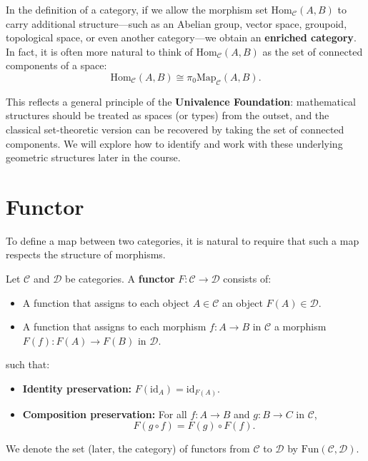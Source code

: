 \begin{remark}
In the definition of a category, if we allow the morphism set $\mathrm{Hom}_{\mathcal{C}}(A, B)$ to carry additional structure—such as an Abelian group, vector space, groupoid, topological space, or even another category—we obtain an \textbf{enriched category}. In fact, it is often more natural to think of $\mathrm{Hom}_{\mathcal{C}}(A, B)$ as the set of connected components of a space:
\[
\mathrm{Hom}_{\mathcal{C}}(A, B) \cong \pi_0 \mathrm{Map}_{\mathcal{C}}(A, B).
\]

This reflects a general principle of the \textbf{Univalence Foundation}: mathematical structures should be treated as spaces (or types) from the outset, and the classical set-theoretic version can be recovered by taking the set of connected components. We will explore how to identify and work with these underlying geometric structures later in the course.
\end{remark} 

\section{Functor}

To define a map between two categories, it is natural to require that such a map respects the structure of morphisms.

\begin{definition}[Functor]
Let $\mathcal{C}$ and $\mathcal{D}$ be categories. A \textbf{functor} $F: \mathcal{C} \to \mathcal{D}$ consists of:
\begin{itemize}
    \item A function that assigns to each object $A \in \mathcal{C}$ an object $F(A) \in \mathcal{D}$.
    \item A function that assigns to each morphism $f: A \to B$ in $\mathcal{C}$ a morphism $F(f): F(A) \to F(B)$ in $\mathcal{D}$.
\end{itemize}
such that:
\begin{itemize}
    \item \textbf{Identity preservation:} $F(\mathrm{id}_A) = \mathrm{id}_{F(A)}$.
    \item \textbf{Composition preservation:} For all $f: A \to B$ and $g: B \to C$ in $\mathcal{C}$,
    \[
    F(g \circ f) = F(g) \circ F(f).
    \]
\end{itemize}
\end{definition}

We denote the set (later, the category) of functors from $\mathcal{C}$ to $\mathcal{D}$ by $\mathrm{Fun}(\mathcal{C}, \mathcal{D})$.

